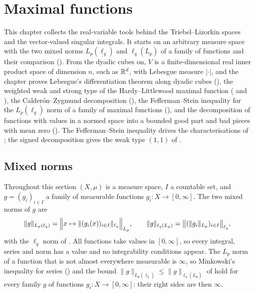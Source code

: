 \chapter{Maximal functions}
\label{ch:maximal-functions}

This chapter collects the real-variable tools behind the Triebel--Lizorkin spaces and the
vector-valued singular integrals. It starts on an arbitrary measure space with the two mixed norms
$L_p(\ell_q)$ and $\ell_q(L_p)$ of a family of functions and their comparison
(). From the dyadic cubes on, $V$ is a finite-dimensional real inner
product space of dimension $n$, such as $\mathbb{R}^d$, with Lebesgue measure $|\cdot|$, and the chapter
proves Lebesgue's differentiation theorem along dyadic cubes
(), the weighted weak and strong type of the
Hardy--Littlewood maximal function ( and
), the Calder\'on--Zygmund decomposition
(), the Fefferman--Stein inequality
for the $L_p(\ell_q)$ norm of a family of maximal functions (), and the
decomposition of functions with values in a normed space into a bounded good part and bad pieces
with mean zero (). The Fefferman--Stein inequality drives the
characterisations of ; the signed decomposition gives the weak type
$(1,1)$ of .

\section{Mixed norms}

Throughout this section $(X, \mu)$ is a measure space, $I$ a countable set, and
$g = (g_i)_{i \in I}$ a family of measurable functions $g_i : X \to [0, \infty]$. The two mixed
norms of $g$ are
\[
  \|g\|_{L_p(\ell_q)} = \Bigl\| x \mapsto \|(g_i(x))_{i \in I}\|_{\ell_q} \Bigr\|_{L_p},
  \qquad
  \|g\|_{\ell_q(L_p)} = \bigl\| (\|g_i\|_{L_p})_{i \in I} \bigr\|_{\ell_q},
\]
with the $\ell_q$ norm of . All functions take values in $[0, \infty]$, so
every integral, series and norm has a value and no integrability conditions appear. The $L_p$
norm of a function that is not almost everywhere measurable is $\infty$, so Minkowski's
inequality for series () and the bound
$\|g\|_{L_p(\ell_q)} \leq \|g\|_{\ell_q(L_p)}$ of  hold for every family
$g$ of functions $g_i : X \to [0, \infty]$: their right sides are then $\infty$.

